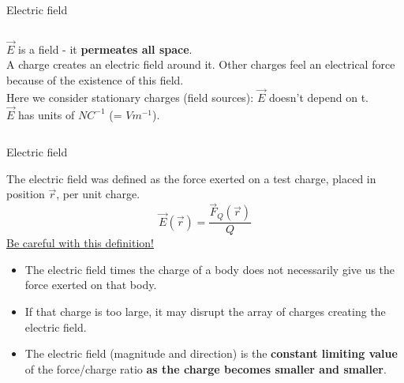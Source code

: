 \begin{frame}{Electric field}
\begin{columns}
\begin{column}{0.50\textwidth}
{     $\vec{E}$ is a field - it {\bf permeates all space}.\\
     A charge creates an electric field around it. Other charges feel an electrical force because
     of the existence of this field.\\
     \vspace{0.1cm}
     Here we consider stationary charges (field sources):
     $\vec{E}$ doesn't depend on t.\\
     \vspace{0.2cm}
     $\vec{E}$ has units of $NC^{-1}$ (= $Vm^{-1}$).
  }
  \end{column}
\end{columns}
\end{frame}


%
%
%

\begin{frame}{Electric field}

The electric field was defined as the force exerted on a test charge, placed in position $\vec{r}$, per unit charge.
\begin{equation*}
  \vec{E}(\vec{r}) = \frac{\vec{F}_Q(\vec{r})}{Q}
\end{equation*}
\vspace{0.3cm}
\underline{Be careful with this definition!}\\
\begin{itemize}
  \item The electric field times the charge of a body  does not necessarily give us the force exerted on that body.
  \item If that charge is too large, it may disrupt the array of charges creating the electric field.
  \item The electric field (magnitude and direction) is the {\bf constant limiting value}
        of the force/charge ratio {\bf as the charge becomes smaller and smaller}.
\end{itemize}
\end{frame}


%
%
%

